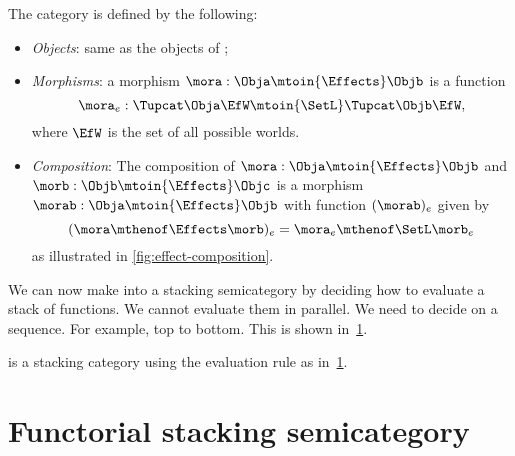 \begin{definition}
    The \Effects category is defined by the following:
    \begin{itemize}
        \item \emph{Objects}: same as the objects of \SetL;
        \item \emph{Morphisms}: a morphism $\mora: \Obja \mtoin{\Effects} \Objb$ is a function
              \begin{equation}
                  \mora_e: \Tupcat \Obja \EfW \mtoin{\SetL} \Tupcat \Objb \EfW,
              \end{equation}
              where $\EfW$ is the set of all possible worlds.
        \item \emph{Composition}: The composition of  $\mora: \Obja \mtoin{\Effects} \Objb$ and
              $\morb: \Objb \mtoin{\Effects} \Objc$ is a morphism $\morab: \Obja \mtoin{\Effects} \Objb$ with function $(\morab)_e$ given by
              \begin{equation}
                  (\mora \mthenof \Effects \morb)
                  _e = \mora_e \mthenof\SetL \morb_e
              \end{equation}
              as illustrated in \cref{fig:effect-composition}.
    \end{itemize}
\end{definition}

We can now make \Effects into a stacking semicategory by deciding how to evaluate a stack of functions.
We cannot evaluate them in parallel.
We need to decide on a sequence.
For example, top to bottom.
This is shown in~\cref{fig:effect-stacking}.

\begin{lemma}
    \label{lem:effects-is-stacking}
    \Effects is a stacking category using the evaluation rule as in~\cref{fig:effect-stacking}.
\end{lemma}

\begin{figure}[h!]
    \centering
    \caption{}
    \label{fig:effect-stacking}
\end{figure}


\section{Functorial stacking semicategory}

